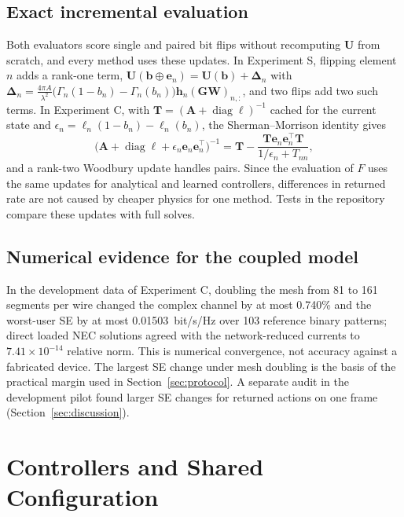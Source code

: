 \documentclass[conference]{IEEEtran}
\newcommand{\bvec}{\mathbf b}
\begin{document}
\subsection{Exact incremental evaluation}
Both evaluators score single and paired bit flips without recomputing $\mathbf U$ from scratch, and every method uses these updates. In Experiment S, flipping element $n$ adds a rank-one term, $\mathbf U(\bvec\oplus\mathbf e_n)=\mathbf U(\bvec)+\mathbf\Delta_n$ with $\mathbf\Delta_n=\tfrac{4\pi A}{\lambda^2}\bigl(\Gamma_n(1-b_n)-\Gamma_n(b_n)\bigr)\mathbf h_n(\mathbf G\mathbf W)_{n,:}$, and two flips add two such terms. In Experiment C, with $\mathbf T=(\mathbf A+\operatorname{diag}\boldsymbol\ell)^{-1}$ cached for the current state and $\epsilon_n=\ell_n(1-b_n)-\ell_n(b_n)$, the Sherman--Morrison identity gives
\begin{equation}
\bigl(\mathbf A+\operatorname{diag}\boldsymbol\ell+\epsilon_n\mathbf e_n\mathbf e_n^{\!\top}\bigr)^{-1}=\mathbf T-\frac{\mathbf T\mathbf e_n\mathbf e_n^{\!\top}\mathbf T}{1/\epsilon_n+T_{nn}},\label{eq:sm}
\end{equation}
and a rank-two Woodbury update handles pairs. Since the evaluation of $F$ uses the same updates for analytical and learned controllers, differences in returned rate are not caused by cheaper physics for one method. Tests in the repository compare these updates with full solves.

\subsection{Numerical evidence for the coupled model}
In the development data of Experiment C, doubling the mesh from 81 to 161 segments per wire changed the complex channel by at most 0.740\% and the worst-user SE by at most 0.01503~bit/s/Hz over 103 reference binary patterns; direct loaded NEC solutions agreed with the network-reduced currents to $7.41\times10^{-14}$ relative norm. This is numerical convergence, not accuracy against a fabricated device. The largest SE change under mesh doubling is the basis of the practical margin used in Section~\ref{sec:protocol}. A separate audit in the development pilot found larger SE changes for returned actions on one frame (Section~\ref{sec:discussion}).

\section{Controllers and Shared Configuration}\label{sec:controllers}
\end{document}
